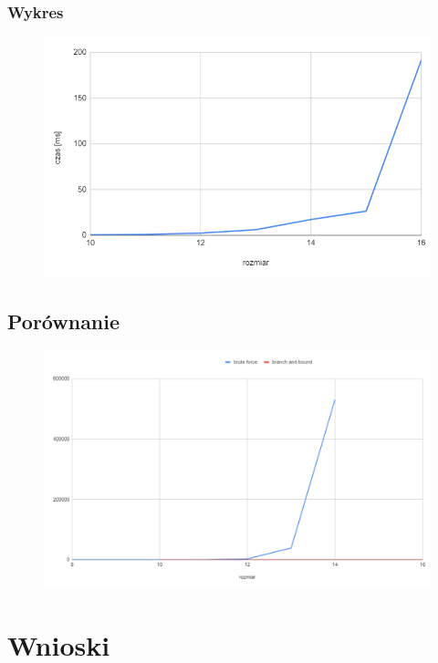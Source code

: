 \documentclass{article}
\begin{document}
\subsubsection{Wykres}
\begin{figure}[h]
    \centering
    \includegraphics[scale=0.4]{img/wykres2.png}
\end{figure}


\subsection{Porównanie}
\begin{figure}[h]
    \centering
    \includegraphics[scale=0.2]{img/wykres3.png}
\end{figure}

\newpage

\section{Wnioski}
\end{document}
